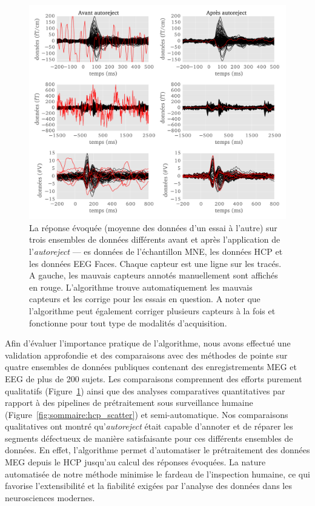 \begin{figure}[htb!]
	\centering
	\includegraphics[width=0.9\linewidth]{figures/figure5_sommaire.pdf}
    \caption[]{La réponse évoquée (moyenne des données d'un essai à l'autre) sur trois ensembles de données différents avant et après l'application de l'\emph{autoreject} --- es données de l'échantillon MNE, les données HCP et les données EEG Faces. Chaque capteur est une ligne sur les tracés. A gauche, les mauvais capteurs annotés manuellement sont affichés en rouge. L'algorithme trouve automatiquement les mauvais capteurs et les corrige pour les essais en question. A noter que l’algorithme peut également corriger plusieurs capteurs à la fois et fonctionne pour tout type de modalités d'acquisition.}
    \label{fig:sommaire:sample_evoked}
\end{figure}

Afin d'évaluer l'importance pratique de l'algorithme, nous avons effectué une validation approfondie et des comparaisons avec des méthodes de pointe sur quatre ensembles de données publiques contenant des enregistrements MEG et EEG de plus de 200 sujets. Les comparaisons comprennent des efforts purement qualitatifs (Figure~\ref{fig:sommaire:sample_evoked}) ainsi que des analyses comparatives quantitatives par rapport à des pipelines de prétraitement sous surveillance humaine (Figure~\ref{fig:sommaire:hcp_scatter}) et semi-automatique. Nos comparaisons qualitatives ont montré qu'\emph{autoreject} était capable d'annoter et de réparer les segments défectueux de manière satisfaisante pour ces différents ensembles de données. En effet, l'algorithme permet d'automatiser le prétraitement des données MEG depuis le HCP jusqu'au calcul des réponses évoquées. La nature automatisée de notre méthode minimise le fardeau de l'inspection humaine, ce qui favorise l'extensibilité et la fiabilité exigées par l'analyse des données dans les neurosciences modernes.

